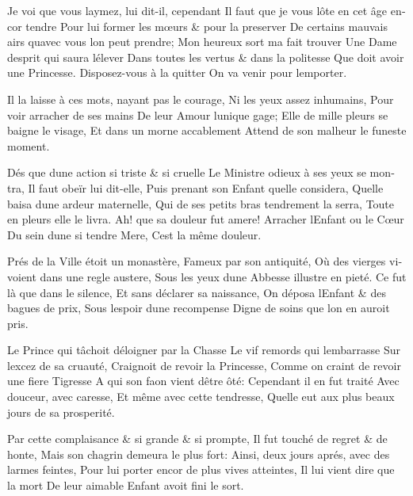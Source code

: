 \documentclass[14pt,a4paper]{memoir}
\begin{document}
\begin{otherlanguage}{french}
{Je voi que vous l\textquotesingle aymez, lui dit-il, cependant} {Il
faut que je vous l\textquotesingle ôte en cet âge encor tendre } {Pour
lui former les mœurs \& pour la preserver} {De certains mauvais airs
qu\textquotesingle avec vous l\textquotesingle on peut prendre;} {Mon
heureux sort m\textquotesingle a fait trouver} {Une Dame
d\textquotesingle esprit qui saura l\textquotesingle élever} {Dans
toutes les vertus \& dans la politesse} {Que doit avoir une Princesse.}
{Disposez-vous à la quitter} {On va venir pour
l\textquotesingle emporter.}

{Il la laisse à ces mots, n\textquotesingle ayant pas le courage, } {Ni
les yeux assez inhumains,} {Pour voir arracher de ses mains} {De leur
Amour l\textquotesingle unique gage;} {Elle de mille pleurs se baigne le
visage,} {Et dans un morne accablement} {Attend de son malheur le
funeste moment.}

{Dés que d\textquotesingle une action si triste \& si cruelle } {Le
Ministre odieux à ses yeux se montra,} {Il faut obeïr lui dit-elle,}
{Puis prenant son Enfant qu\textquotesingle elle considera,}
{Qu\textquotesingle elle baisa d\textquotesingle une ardeur maternelle,}
{Qui de ses petits bras tendrement la serra,} {Toute en pleurs elle le
livra.} {Ah! que sa douleur fut amere!} {Arracher
l\textquotesingle Enfant ou le Cœur} {Du sein d\textquotesingle une si
tendre Mere,} {C\textquotesingle est la même douleur.}

{Prés de la Ville étoit un monastère,} {Fameux par son antiquité,} {Où
des vierges vivoient dans une regle austere, } {Sous les yeux
d\textquotesingle une Abbesse illustre en pieté.} {Ce fut là que dans le
silence,} {Et sans déclarer sa naissance,} {On déposa
l\textquotesingle Enfant \& des bagues de prix,} {Sous
l\textquotesingle espoir d\textquotesingle une recompense} {Digne de
soins que l\textquotesingle on en auroit pris.}

{Le Prince qui tâchoit d\textquotesingle éloigner par la Chasse} {Le vif
remords qui l\textquotesingle embarrasse} {Sur l\textquotesingle excez
de sa cruauté,} {Craignoit de revoir la Princesse,} {Comme on craint de
revoir une fiere Tigresse} {A qui son faon vient d\textquotesingle être
ôté:} {Cependant il en fut traité} {Avec douceur, avec caresse,} {Et
même avec cette tendresse,} {Qu\textquotesingle elle eut aux plus beaux
jours de sa prosperité.}

{Par cette complaisance \& si grande \& si prompte,} {Il fut touché de
regret \& de honte,} {Mais son chagrin demeura le plus fort:} {Ainsi,
deux jours aprés, avec des larmes feintes, } {Pour lui porter encor de
plus vives atteintes,} {Il lui vient dire que la mort} {De leur aimable
Enfant avoit fini le sort.}


\end{otherlanguage}
\end{document}
